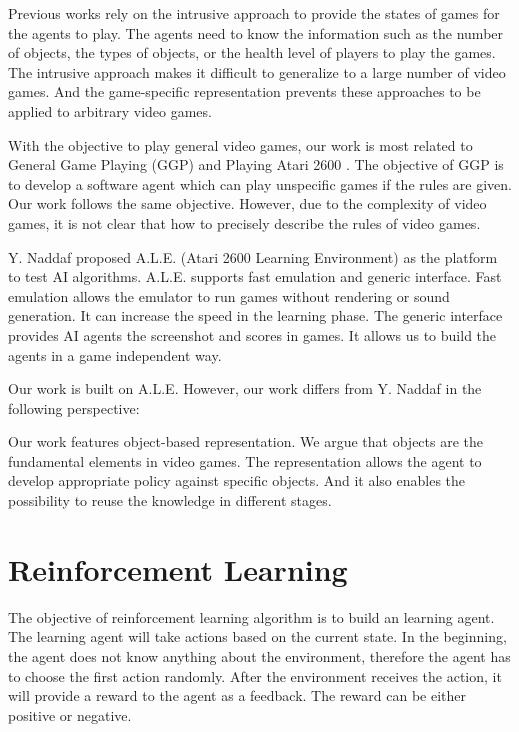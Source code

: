 Previous works rely on the intrusive approach to provide the states of games for the agents to play.
The agents need to know the information such as the number of objects, the types of objects,
or the health level of players to play the games. The intrusive approach makes it difficult to generalize
to a large number of video games. And the game-specific representation prevents these approaches
to be applied to arbitrary video games.

With the objective to play general video games, our work is most related to 
General Game Playing\cite{GGP} (GGP) and Playing Atari 2600 \cite{Yavar}. 
The objective of GGP is to develop a software agent which can play unspecific games if the rules
are given. Our work follows the same objective. However, due to the complexity of video games, 
it is not clear that how to precisely describe the rules of video games.

Y. Naddaf\cite{Yavar} proposed A.L.E. (Atari 2600 Learning Environment) as the platform to test AI algorithms.
A.L.E. supports fast emulation and generic interface. Fast emulation allows the emulator to run 
games without rendering or sound generation. It can increase the speed in the learning phase.
The generic interface provides AI agents the screenshot and scores in games. It allows us
to build the agents in a game independent way.

Our work is built on A.L.E. However, our work differs from Y. Naddaf in the following perspective:

\begin{itemize}{}
Our work features object-based representation. We argue that objects are the fundamental elements
in video games. The representation allows the agent to develop appropriate policy against specific 
objects. And it also enables the possibility to reuse the knowledge in different stages.
\end{itemize}

\chapter{Reinforcement Learning}
\label{ch:RL}
The objective of reinforcement learning algorithm is to build an learning agent. The learning agent will take
actions based on the current state. In the beginning, the agent does not know anything about 
the environment, therefore the agent has to choose the first action randomly. After the environment
receives the action, it will provide a reward to the agent as a feedback. The reward can be either
positive or negative.


